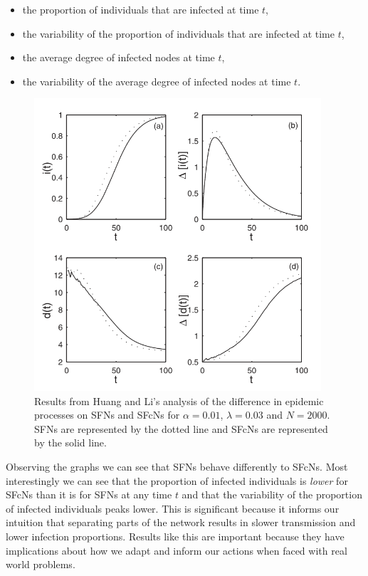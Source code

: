 \vspace{-0.5em}
\begin{itemize}
    \item the proportion of individuals that are infected at time $t$,
    \item the variability of the proportion of individuals that are infected at time $t$,
    \item the average degree of infected nodes at time $t$,
    \item the variability of the average degree of infected nodes at time $t$.
\end{itemize}

\begin{figure}
    \begin{center}
        \includegraphics[width=0.95\textwidth]{img/si}
    \end{center}
    \caption{Results from Huang and Li's analysis of the difference in epidemic processes on SFNs and SFcNs for $\alpha = 0.01$, $\lambda = 0.03$ and $N = 2000$. SFNs are represented by the dotted line and SFcNs are represented by the solid line.}
    \label{fig:si}
\end{figure}

\vspace{-0.5em}
Observing the graphs we can see that SFNs behave differently to SFcNs. Most interestingly we can see that the proportion of infected individuals is \emph{lower} for SFcNs than it is for SFNs at any time $t$ and that the variability of the proportion of infected individuals peaks lower. This is significant because it informs our intuition that separating parts of the network results in slower transmission and lower infection proportions. Results like this are important because they have implications about how we adapt and inform our actions when faced with real world problems.
